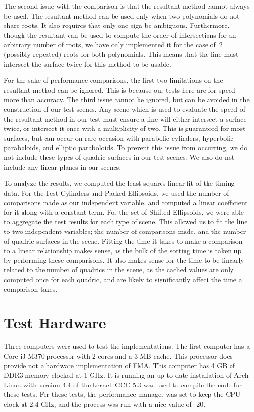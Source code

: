 \documentclass{cccg16}
\begin{document}
The second issue with the comparison is that the resultant method
cannot always be used.  The resultant method can be used only when two
polynomials do not share roots.  It also requires that only one sign
be ambiguous.  Furthermore, though the resultant can be used to
compute the order of intersections for an arbitrary number of roots,
we have only implemented it for the case of~$2$ (possibly repeated)
roots for both polynomials.  This means that the line must intersect
the surface twice for this method to be usable.

For the sake of performance comparisons, the first two limitations on
the resultant method can be ignored.  This is because our tests here
are for speed more than accuracy.  The third issue cannot be ignored,
but can be avoided in the construction of our test scenes.  Any scene
which is used to evaluate the speed of the resultant method in our
test must ensure a line will either intersect a surface twice, or
intersect it once with a multiplicity of two.  This is guaranteed for
most surfaces, but can occur on rare occasion with parabolic
cylinders, hyperbolic paraboloids, and elliptic paraboloids.  To
prevent this issue from occurring, we do not include these types of
quadric surfaces in our test scenes.  We also do not include any
linear planes in our scenes.

To analyze the results, we computed the least squares linear fit of
the timing data.  For the Test Cylinders and Packed Ellipsoids, we
used the number of comparisons made as our independent variable, and
computed a linear coefficient for it along with a constant term.  For
the set of Shifted Ellipsoids, we were able to aggregate
the test results for each type of scene.  This allowed us to fit the
line to two independent variables; the number of comparisons made, and
the number of quadric surfaces in the scene.  Fitting the time it
takes to make a comparison to a linear relationship makes sense, as
the bulk of the sorting time is taken up by performing these
comparisons.  It also makes sense for the time to be linearly related
to the number of quadrics in the scene, as the cached values are only
computed once for each quadric, and are likely to significantly affect
the time a comparison takes.

\section{Test Hardware}
Three computers were used to test the implementations.  The first
computer has a Core i3 M370 processor with 2 cores and a 3 MB cache.
This processor does provide not a hardware implementation of FMA.
This computer has 4 GB of DDR3 memory clocked at 1 GHz.  It is running
an up to date installation of Arch Linux with version 4.4 of the
kernel.  GCC 5.3 was used to compile the code for these tests.  For
these tests, the performance manager was set to keep the CPU clock at
2.4 GHz, and the process was run with a nice value of -20.
\end{document}
